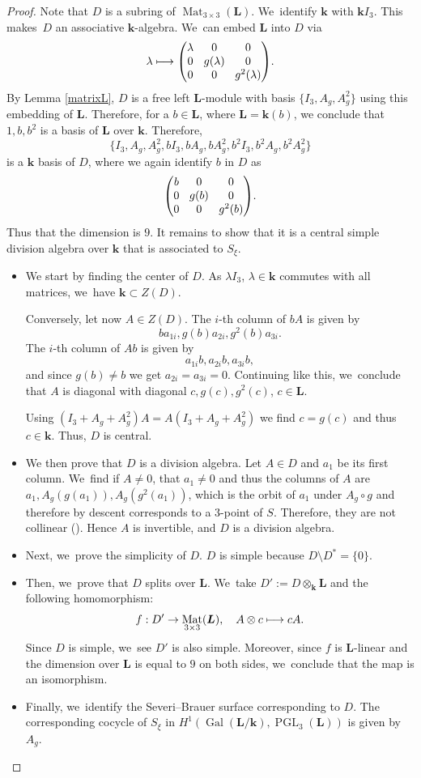\documentclass[JEP,XML,SOM,Unicode,NoFloatCountersInSection, NoEqCountersInSection,published]{cedram}
\newcommand\mto{\mathchoice{\longmapsto}{\mapsto}{\mapsto}{\mapsto}}
\DeclareMathOperator{\Gal}{Gal}
\DeclareMathOperator{\Mat}{Mat}
\theoremstyle{definition}
\newcommand{\kk}{{\boldsymbol{k}}}
\newcommand{\LL}{{\boldsymbol{L}}}
\DeclareMathOperator{\PGL}{PGL}
\begin{document}
\begin{proof}
Note that $D$ is a subring of $\Mat_{3 \times 3}(\LL)$. We~identify $\kk$ with $\kk I_3$. This makes~$D$ an associative $\kk$-algebra. We~can embed $\LL$ into $D$ via
\[\arraycolsep4.5pt
\lambda \mto \begin{pmatrix}
\lambda & 0 & 0 \\
0 & g(\lambda) & 0 \\
0 & 0 & g^2(\lambda)
\end{pmatrix}\!.
\]
By Lemma \ref{matrixL}, $D$ is a free left $\LL$-module with basis $\{ I_3, A_g, A_g^2\}$ using this embedding of $\LL$. Therefore, for a $b \in \LL$, where $\LL = \kk(b)$, we conclude that $1,b,b^2$ is a basis of $\LL$ over $\kk$. Therefore,
\[
\{ I_3, A_g, A_g^2, bI_3, bA_g, bA_g^2,b^2I_3,b^2A_g,b^2A_g^2\}
\]
is a $\kk$ basis of $D$, where we again identify $b$ in $D$ as
\[\arraycolsep4.5pt
\begin{pmatrix}
b & 0 & 0 \\
0 & g(b) & 0 \\
0 & 0 & g^2(b)
\end{pmatrix}\!.
\]
Thus that the dimension is $9$. It remains to show that it is a central simple division algebra over $\kk$ that is associated to $S_{\xi}$.
\begin{itemize}
\item We start by finding the center of $D$. As $\lambda I_3$, $\lambda \in \kk$ commutes with all matrices, we~have $\kk \subset Z(D)$.

Conversely, let now $A \in Z(D)$. The $i$-th column of $bA$ is given by
\[
ba_{1i}, g(b)a_{2i}, g^2(b)a_{3i}.
\]
The $i$-th column of $Ab$ is given by
\[
a_{1i}b, a_{2i}b, a_{3i}b,
\]
and since $g(b) \neq b$ we get $a_{2i}=a_{3i}=0$. Continuing like this, we~conclude that $A$ is diagonal with diagonal $c,g(c),g^2(c)$, $c \in \LL$.

Using $(I_3 + A_g + A_g^2) A = A (I_3 + A_g + A_g^2)$ we find $c=g(c)$ and thus $c \in \kk$. Thus, $D$ is central.
\item We then prove that $D$ is a division algebra. Let $A \in D$ and $a_1$ be its first column. We~find if $A \neq 0$, that $a_1 \neq 0$ and thus the columns of $A$ are $a_1, A_g(g(a_1)), A_g(g^2(a_1))$, which is the orbit of $a_1$ under $A_g \circ g$ and therefore by descent corresponds to a $3$\nobreakdash-point of $S$. Therefore, they are not collinear (\cite[Proof of 2.3.2]{BSY}). Hence $A$ is invertible, and $D$ is a division algebra.
\item Next, we~prove the simplicity of $D$. $D$ is simple because $D \setminus D^* = \{ 0 \}$.
\item Then, we~prove that $D$ splits over $\LL$. We~take $D':= D \otimes_{\kk} \LL$ and the following homomorphism:
\[
f: D' \to \Mat_{3 \times 3}(\LL), \quad A \otimes c \mto cA.
\]
Since $D$ is simple, we~see $D'$ is also simple. Moreover, since $f$ is $\LL$-linear and the dimension over $\LL$ is equal to $9$ on both sides, we~conclude that the map is an isomorphism.
\item Finally, we~identify the Severi--Brauer surface corresponding to $D$. The corresponding cocycle of $S_{\xi}$ in $H^1(\Gal(\LL/\kk), \PGL_3(\LL))$ is given by $A_g$.


\end{itemize}
\end{proof}
\end{document}
